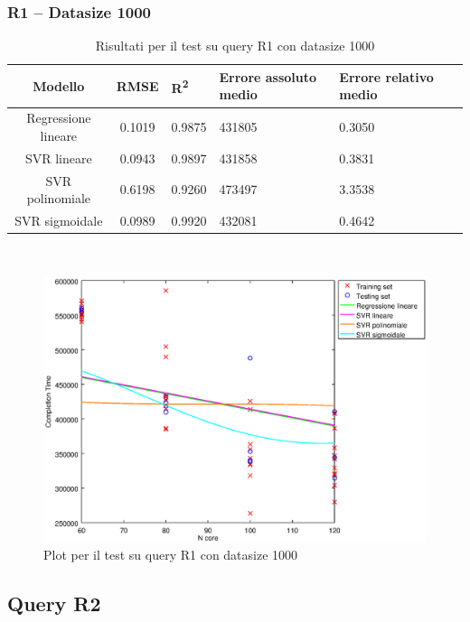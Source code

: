 \documentclass[a4paper,11pt]{article}
\begin{document}
\subsubsection{R1 -- Datasize 1000}
\begin{table}[bhpt]
	\centering
	\begin{adjustbox}{center}
		\begin{tabular}{c | c M{1.2cm} M{2.5cm} M{2.5cm} M{1.8cm}}
			Modello & RMSE & R\textsuperscript{2} & Errore assoluto medio & Errore relativo medio \tabularnewline
			\hline
			Regressione lineare & 0.1019 & 0.9875 & 431805 & 0.3050 \\
			SVR lineare & 0.0943 & 0.9897 & 431858 & 0.3831 \\
			SVR polinomiale & 0.6198 & 0.9260 & 473497 & 3.3538 \\
			SVR sigmoidale & 0.0989 & 0.9920 & 432081 & 0.4642 \\
		\end{tabular}
	\end{adjustbox}
	\\
	\caption{Risultati per il test su query R1 con datasize 1000}
	\label{table_R1_1000}
\end{table}

\begin {figure}[hbtp]
\centering
\includegraphics[width=\textwidth]{output/R1_1000/plot_R1_1000.eps}
\caption {Plot per il test su query R1 con datasize 1000}
\end {figure}

\newpage
\subsection{Query R2}
\end{document}
